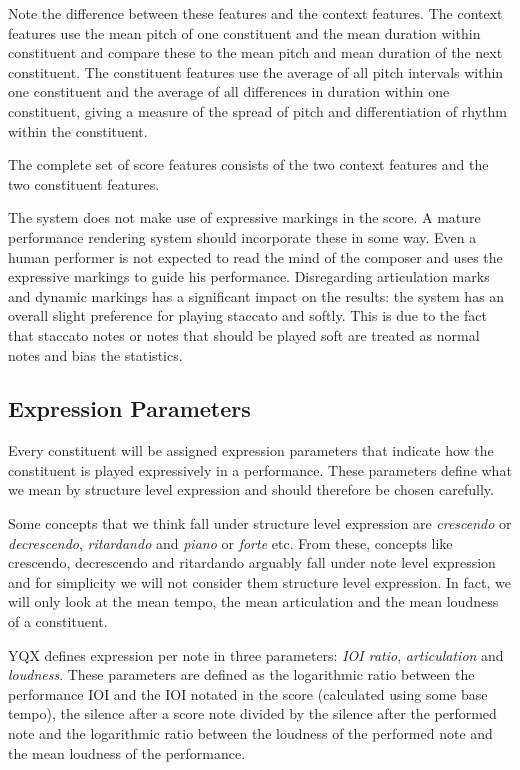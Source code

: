 \documentclass[a4paper,10pt]{article}
\begin{document}
Note the difference between these features and the context features. The context features use the mean pitch of one constituent and the mean duration within constituent and compare these to the mean pitch and mean duration of the next constituent. The constituent features use the average of all pitch intervals within one constituent and the average of all differences in duration within one constituent, giving a measure of the spread of pitch and differentiation of rhythm within the constituent.

The complete set of score features consists of the two context features and the two constituent features. 

The system does not make use of expressive markings in the score. A mature performance rendering system should incorporate these in some way. Even a human performer is not expected to read the mind of the composer and uses the expressive markings to guide his performance. Disregarding articulation marks and dynamic markings has a significant impact on the results: the system has an overall slight preference for playing staccato and softly. This is due to the fact that staccato notes or notes that should be played soft are treated as normal notes and bias the statistics. 



\subsection{Expression Parameters}
\label{sec:targets}

Every constituent will be assigned expression parameters that indicate how the constituent is played expressively in a performance. These parameters define what we mean by structure level expression and should therefore be chosen carefully. 

Some concepts that we think fall under structure level expression are \textit{crescendo} or \textit{decrescendo}, \textit{ritardando} and \textit{piano} or \textit{forte} etc.
From these, concepts like crescendo, decrescendo and ritardando arguably fall under note level expression and for simplicity we will not consider them structure level expression. In fact, we will only look at the mean tempo, the mean articulation and the mean loudness of a constituent.

YQX defines expression per note in three parameters: \textit{IOI ratio}, \textit{articulation} and \textit{loudness}. These parameters are defined as the logarithmic ratio between the performance IOI and the IOI notated in the score (calculated using some base tempo), the silence after a score note divided by the silence after the performed note and the logarithmic ratio between the loudness of the performed note and the mean loudness of the performance. 
\end{document}

